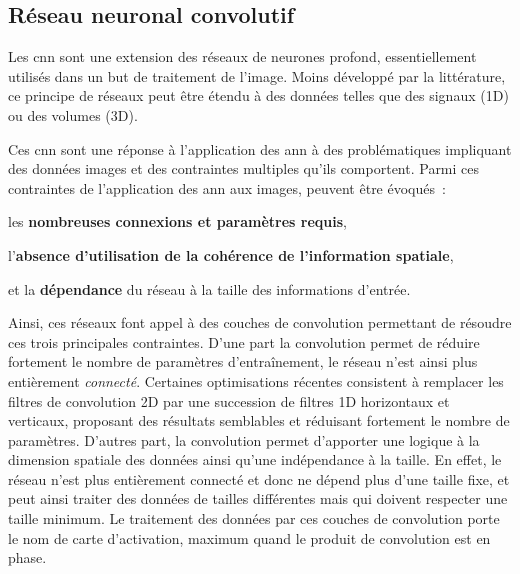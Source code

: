\subsection{Réseau neuronal convolutif}
\label{sec:convolutionnal_neural_network}
Les \gls{cnn} sont une extension des réseaux de neurones profond, essentiellement utilisés dans un but de traitement de l'image. Moins développé par la littérature, ce principe de réseaux peut être étendu à des données telles que des signaux (1D) ou des volumes (3D).\par

Ces \gls{cnn} sont une réponse à l'application des \gls{ann} à des problématiques impliquant des données images et des contraintes multiples qu'ils comportent. Parmi ces contraintes de l'application des \gls{ann} aux images, peuvent être évoqués~: 
\begin{inlinerate}
    \item les \textbf{nombreuses connexions et paramètres requis},
    \item l'\textbf{absence d'utilisation de la cohérence de l'information spatiale},
    \item et la \textbf{dépendance} du réseau à la taille des informations d'entrée.
\end{inlinerate}\par

Ainsi, ces réseaux font appel à des couches de convolution permettant de résoudre ces trois principales contraintes. D'une part la convolution permet de réduire fortement le nombre de paramètres d'entraînement, le réseau n'est ainsi plus entièrement \textit{connecté}. Certaines optimisations récentes consistent à remplacer les filtres de convolution 2D par une succession de filtres 1D horizontaux et verticaux, proposant des résultats semblables et réduisant fortement le nombre de paramètres. D'autres part, la convolution permet d'apporter une logique à la dimension spatiale des données ainsi qu'une indépendance à la taille. En effet, le réseau n'est plus entièrement connecté et donc ne dépend plus d'une taille fixe, et peut ainsi traiter des données de tailles différentes mais qui doivent respecter une taille minimum. Le traitement des données par ces couches de convolution porte le nom de carte d'activation, maximum quand le produit de convolution est en phase.\par


